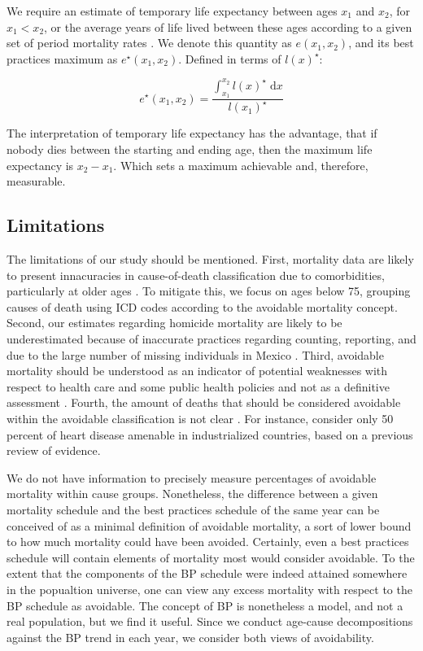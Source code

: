\documentclass{article}
\newcommand{\dd}{\; \mathrm{d}}
\begin{document}
We require an estimate of temporary life expectancy between ages
$x_1$ and $x_2$, for $x_1<x_2$, or the average years of life lived between these ages according to a given set of period mortality rates \citep{arriaga1984}. We denote this quantity as
$e(x_1,x_2)$, and its best practices maximum as $e^{\star}(x_1,x_2)$. Defined in
terms of $l(x)^\star$:

\begin{equation}
e^{\star}(x_1,x_2) = \frac{\int _{x_1}^{x_2} l(x)^\star \dd x}{l(x_1)^\star}
\end{equation}

The interpretation of temporary life expectancy has the advantage, that if nobody dies between the starting and ending age, then the maximum life expectancy is $x_2-x_1$. Which sets a maximum achievable and, therefore, measurable.

\subsection*{Limitations}
The limitations of our study should be mentioned. First, mortality data are
likely to present innacuracies in cause-of-death classification due to
comorbidities, particularly at older ages \citep{tobias2001}. To mitigate this,
we focus on ages below 75, grouping causes of death using ICD codes according to
the avoidable mortality concept.
Second, our estimates regarding homicide mortality are likely to be
underestimated because of inaccurate practices regarding counting, reporting,
and due to the large number of missing individuals in Mexico \citep{HRW2011}.
Third, avoidable mortality should be understood as an indicator of potential
weaknesses with respect to health care and some public health policies and not
as a definitive assessment \citep{nolte&mckee2008}. Fourth, the amount of deaths
that should be considered avoidable within the avoidable classification is not
clear \citep{beltran2011avoidable}. For instance, \citet{nolte2012amenable}
consider only 50 percent of heart disease amenable in industrialized countries,
based on a previous review of evidence.

We do not have information to precisely
measure percentages of avoidable mortality within cause groups. Nonetheless, the
difference between a given mortality schedule and the best practices schedule of
the same year can be conceived of as a minimal definition of avoidable
mortality, a sort of lower bound to how much mortality could have been avoided.
Certainly, even a best practices schedule will contain elements of mortality
most would consider avoidable. To the extent that the components of the BP schedule were indeed
attained somewhere in the popualtion universe, one can view any excess mortality
with respect to the BP schedule as avoidable. The concept of BP is nonetheless a
model, and not a real population, but we find it useful. Since we conduct
age-cause decompositions against the BP trend in each year, we consider both
views of avoidability.
\end{document}
